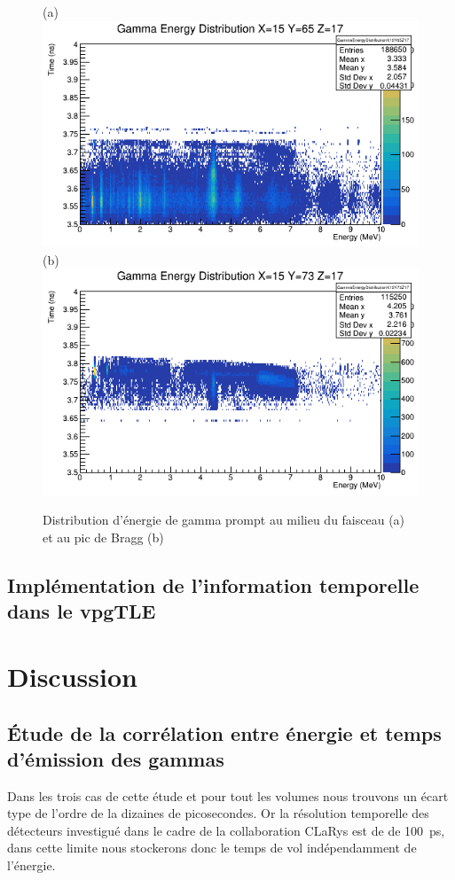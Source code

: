\documentclass[11pt,a4paper,oldfontcommands]{memoir}
\begin{document}
\begin{figure}[h!]
\centering
\subfloat(a){\includegraphics[scale=0.37]{CT/TPS/faisceaugamma.png}}
\subfloat(b){\includegraphics[scale=0.37]{CT/TPS/BraggGamma.png}}
\caption{Distribution d'énergie de gamma prompt au milieu du faisceau (a) et au pic de Bragg (b)}
\label{tps pg}
\end{figure}

\subsection{Implémentation de l'information temporelle dans le vpgTLE}

\section{Discussion}
\subsection{\'Etude de la corrélation entre énergie et temps d'émission des gammas}
Dans les trois cas de cette étude et pour tout les volumes nous trouvons un écart type de l'ordre de la dizaines de picosecondes. Or la résolution temporelle des détecteurs investigué dans le cadre de la collaboration CLaRys est de de 100~ps, dans cette limite nous stockerons donc le temps de vol indépendamment de l'énergie.  
\end{document}

